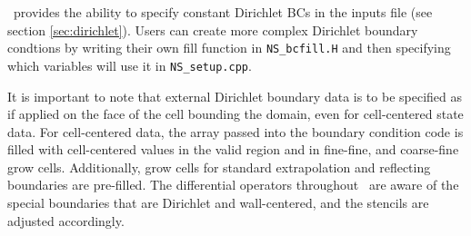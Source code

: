 \iamr\ provides the ability to specify constant Dirichlet BCs 
in the inputs file (see section \ref{sec:dirichlet}).
Users can create more complex Dirichlet boundary condtions by writing
their own fill function in {\tt NS\_bcfill.H} and then specifying which variables
will use it in {\tt NS\_setup.cpp}. 

It is important to note that external Dirichlet boundary data is to be specified as 
if applied on the face of the cell bounding the domain, even for cell-centered
state data. For cell-centered data, the array passed into the 
boundary condition code is filled with cell-centered values in the valid 
region and in fine-fine, and coarse-fine grow cells.  Additionally, grow cells 
for standard extrapolation and reflecting boundaries are pre-filled.  The 
differential operators throughout \iamr\ are aware of the special boundaries
that are Dirichlet and wall-centered, and the stencils are adjusted accordingly.

